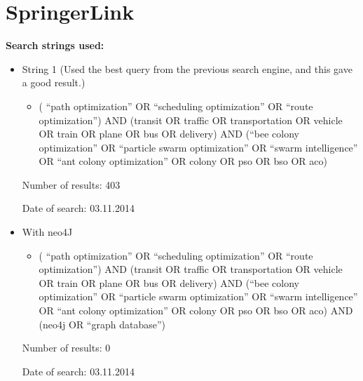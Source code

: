 \section{SpringerLink}
\textbf{Search strings used:}
\begin{itemize}
\item String 1 (Used the best query from the previous search engine, and this gave a good result.)
\begin{itemize}
\item ( ``path optimization'' OR ``scheduling optimization'' OR ``route optimization'') AND (transit OR traffic OR transportation OR vehicle OR train OR plane OR bus OR delivery) AND (``bee colony optimization'' OR ``particle swarm optimization'' OR ``swarm intelligence'' OR ``ant colony optimization'' OR colony OR pso OR bso OR aco)
\end{itemize}
\par
Number of results: 403
\par
Date of search: 03.11.2014
\end{itemize}
\begin{itemize}
\item With neo4J
\begin{itemize}
\item ( ``path optimization'' OR ``scheduling optimization'' OR ``route optimization'') AND (transit OR traffic OR transportation OR vehicle OR train OR plane OR bus OR delivery) AND (``bee colony optimization'' OR ``particle swarm optimization'' OR ``swarm intelligence'' OR ``ant colony optimization'' OR colony OR pso OR bso OR aco) AND (neo4j OR ``graph database'')
\end{itemize}
\par
Number of results: 0
\par
Date of search: 03.11.2014
\end{itemize}

